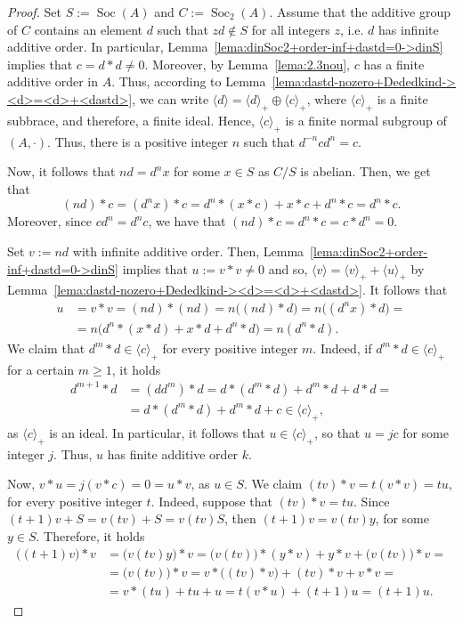 \documentclass[12pt, a4paper, english]{article}
\theoremstyle{definition}
\DeclareMathOperator{\Soc}{Soc}
\begin{document}
\begin{proof}
Set $S:= \Soc(A)$ and $C:= \Soc_2(A)$. Assume that the additive group of $C$ contains an element $d$ such that $zd \notin S$ for all integers $z$, i.e. $d$ has infinite additive order. In particular, Lemma~\ref{lema:dinSoc2+order-inf+dastd=0->dinS} implies that $c = d\ast d \neq 0$. Moreover, by Lemma~\ref{lema:2.3nou}, $c$ has a finite additive order in $A$. Thus, according to Lemma~\ref{lema:dastd-nozero+Dededkind-><d>=<d>+<dastd>}, we can write $\langle d \rangle = \langle d \rangle_+ \oplus \langle c \rangle_+$, where $\langle c \rangle_+$ is a finite subbrace, and therefore, a finite ideal. Hence, $\langle c \rangle_+$ is a finite normal subgroup of $(A, \cdot)$. Thus, there is a positive integer $n$ such that $d^{-n}cd^n = c$. 

Now, it follows that $nd = d^nx$ for some  $x\in S$ as $C/S$ is abelian. Then, we get that
\[ (nd) \ast c = (d^nx)\ast c = d^n \ast (x \ast c) + x \ast c + d^n \ast c = d^n \ast c.\]
Moreover, since $cd^n = d^nc$, we have that $(nd) \ast c = d^n \ast c = c\ast d^n = 0$. 

Set $v := nd$ with infinite additive order. Then, Lemma~\ref{lema:dinSoc2+order-inf+dastd=0->dinS} implies that $u:= v \ast v \neq 0$ and so, $\langle v \rangle = \langle v \rangle_+ + \langle u \rangle_+$ by Lemma~\ref{lema:dastd-nozero+Dededkind-><d>=<d>+<dastd>}. It follows that
\begin{align*}
u & = v \ast v  = (nd) \ast (nd) = n\big((nd) \ast d\big) = n\big((d^nx)\ast d\big) = \\
& = n\big(d^n \ast (x \ast d) +  x \ast d + d^n \ast d\big)  = n(d^n \ast d).
\end{align*}
We claim that $d^m \ast d \in \langle c \rangle_+$ for every positive integer $m$. Indeed, if $d^m \ast d \in \langle c \rangle_+$ for a certain $m \geq 1$, it holds
\begin{align*}
d^{m+1}\ast d & = (dd^m)\ast d = d \ast (d^m\ast d) + d^m\ast d + d \ast d = \\
& = d \ast (d^m\ast d) + d^m\ast d + c \in \langle c \rangle_+,
\end{align*}
as $\langle c \rangle_+$ is an ideal. In particular, it follows that $u\in \langle c \rangle_+$, so that $u = jc$ for some integer $j$. Thus, $u$ has finite  additive order $k$.

Now, $v \ast u = j(v\ast c) = 0 = u \ast v$, as $u \in S$. We claim $(tv) \ast v = t(v \ast v) = tu$, for every positive integer $t$. Indeed, suppose that $(tv) \ast v = tu$. Since $(t+1)v + S = v(tv)+ S = v(tv)S$, then $(t+1)v = v(tv)y$, for some $y\in S$. Therefore, it holds
\begin{align*}
 \big((t+1)v\big) \ast v & = \big(v(tv)y\big) \ast v = \big(v(tv)\big) \ast (y \ast v) + y\ast v + \big(v(tv)\big) \ast v  = \\
& = \big(v(tv)\big) \ast v = v \ast \big((tv)\ast v\big) + (tv) \ast v + v \ast v = \\
& =  v \ast (tu) + tu + u = t(v \ast u) + (t+1)u = (t+1)u.
\end{align*}


\end{proof}
\end{document}
